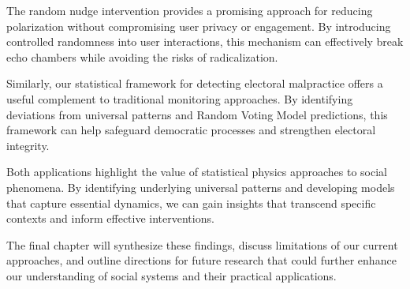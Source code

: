 The random nudge intervention provides a promising approach for reducing polarization without compromising user privacy or engagement. By introducing controlled randomness into user interactions, this mechanism can effectively break echo chambers while avoiding the risks of radicalization.

Similarly, our statistical framework for detecting electoral malpractice offers a useful complement to traditional monitoring approaches. By identifying deviations from universal patterns and Random Voting Model predictions, this framework can help safeguard democratic processes and strengthen electoral integrity.

Both applications highlight the value of statistical physics approaches to social phenomena. By identifying underlying universal patterns and developing models that capture essential dynamics, we can gain insights that transcend specific contexts and inform effective interventions.

The final chapter will synthesize these findings, discuss limitations of our current approaches, and outline directions for future research that could further enhance our understanding of social systems and their practical applications.